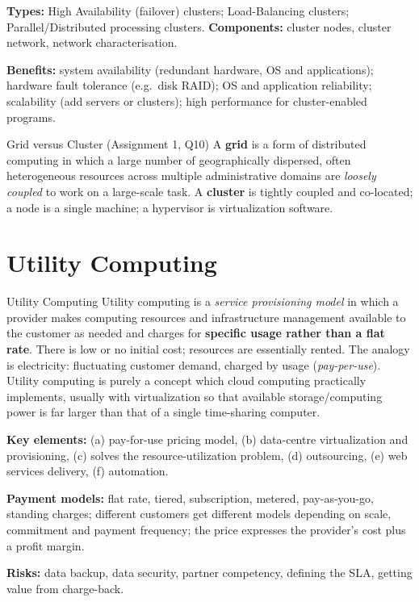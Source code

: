 \documentclass[11pt,a4paper,openany]{report}
\begin{document}
\textbf{Types:} High Availability (failover) clusters; Load-Balancing clusters; Parallel/Distributed
processing clusters. \textbf{Components:} cluster nodes, cluster network, network characterisation.

\textbf{Benefits:} system availability (redundant hardware, OS and applications); hardware fault
tolerance (e.g.\ disk RAID); OS and application reliability; scalability (add servers or clusters);
high performance for cluster-enabled programs.

\begin{notebox}{Grid versus Cluster (Assignment 1, Q10)}
A \textbf{grid} is a form of distributed computing in which a large number of geographically
dispersed, often heterogeneous resources across multiple administrative domains are
\emph{loosely coupled} to work on a large-scale task. A \textbf{cluster} is tightly coupled and
co-located; a node is a single machine; a hypervisor is virtualization software.
\end{notebox}

\section{Utility Computing}
\begin{defbox}{Utility Computing}
Utility computing is a \emph{service provisioning model} in which a provider makes computing
resources and infrastructure management available to the customer as needed and charges for
\textbf{specific usage rather than a flat rate}. There is low or no initial cost; resources are
essentially rented. The analogy is electricity: fluctuating customer demand, charged by usage
(\emph{pay-per-use}). Utility computing is purely a concept which cloud computing practically
implements, usually with virtualization so that available storage/computing power is far larger
than that of a single time-sharing computer.
\end{defbox}

\textbf{Key elements:} (a) pay-for-use pricing model, (b) data-centre virtualization and
provisioning, (c) solves the resource-utilization problem, (d) outsourcing, (e) web services
delivery, (f) automation.

\textbf{Payment models:} flat rate, tiered, subscription, metered, pay-as-you-go, standing charges;
different customers get different models depending on scale, commitment and payment frequency; the
price expresses the provider's cost plus a profit margin.

\textbf{Risks:} data backup, data security, partner competency, defining the SLA, getting value
from charge-back.
\end{document}
